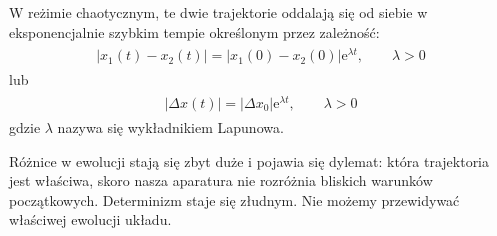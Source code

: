 \documentclass[a4paper,12pt,polish]{sphinxmanual}
\begin{document}
W reżimie chaotycznym, te dwie trajektorie oddalają się od siebie w eksponencjalnie szybkim tempie określonym przez zależność:
\label{ch2/chII011:equation-eqn22}\begin{gather}
\begin{split}|x_1(t) - x_2(t)| = |x_1(0) - x_2(0)|\mbox{e}^{\lambda t}, \qquad \lambda > 0\end{split}\label{ch2/chII011-eqn22}
\end{gather}
lub
\label{ch2/chII011:equation-eqn23}\begin{gather}
\begin{split}|\Delta x(t)| = |\Delta x_0|\mbox{e}^{\lambda t}, \qquad \lambda > 0\end{split}\label{ch2/chII011-eqn23}
\end{gather}
gdzie $\lambda$ nazywa się wykładnikiem Lapunowa.

Różnice w ewolucji stają się zbyt duże i pojawia się dylemat: która trajektoria jest właściwa, skoro nasza aparatura nie rozróżnia bliskich warunków początkowych. Determinizm staje się złudnym. Nie możemy przewidywać właściwej ewolucji układu.
\end{document}
